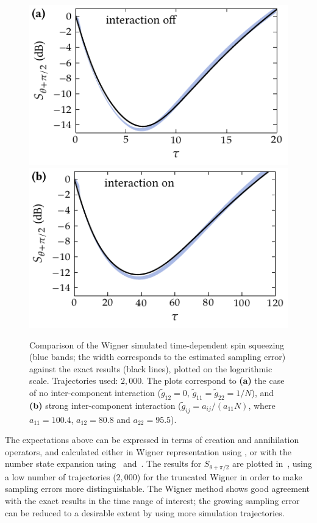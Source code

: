 \begin{figure}
    \centerline{%
    \includegraphics{figures_generated/exact/squeezing_nocc_100.pdf}%
    \includegraphics{figures_generated/exact/squeezing_cc_100.pdf}}

    \caption[Comparison of Wigner simulated spin squeezing with an exact method]{
    Comparison of the Wigner simulated time-dependent spin squeezing (blue bands; the width corresponds to the estimated sampling error) against the exact results (black lines), plotted on the logarithmic scale.
    Trajectories used: $2,000$.
    The plots correspond to \textbf{(a)} the case of no inter-component interaction ($\tilde{g}_{12} = 0$, $\tilde{g}_{11} = \tilde{g}_{22} = 1 / N$), and \textbf{(b)} strong inter-component interaction ($\tilde{g}_{ij} = a_{ij} / (a_{11} N)$, where $a_{11} = 100.4$, $a_{12} = 80.8$ and $a_{22} = 95.5$).}%

    \label{fig:exact:squeezing-comparison}
\end{figure}

The expectations above can be expressed in terms of creation and annihilation operators, and calculated either in Wigner representation using , or with the number state expansion using~ and~.
The results for $S_{\theta+\pi/2}$ are plotted in~, using a low number of trajectories ($2,000$) for the truncated Wigner in order to make sampling errors more distinguishable.
The Wigner method shows good agreement with the exact results in the time range of interest; the growing sampling error can be reduced to a desirable extent by using more simulation trajectories.

